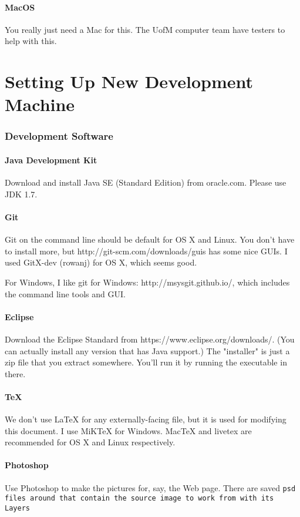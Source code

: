 \documentclass[12pt]{article}
\begin{document}
\subsection{MacOS}
You really just need a Mac for this.  The UofM computer team have testers to help with this.

\part{Setting Up New Development Machine}
\section{Development Software}
\subsection{Java Development Kit}
Download and install Java SE (Standard Edition) from oracle.com.  Please use JDK 1.7.

\subsection{Git}
Git on the command line should be default for OS X and Linux.  You don't have to install more, but http://git-scm.com/downloads/guis has some nice GUIs.  I used GitX-dev (rowanj) for OS X, which seems good.

For Windows, I like git for Windows:  http://msysgit.github.io/, which includes the command line tools and GUI.

\subsection{Eclipse}
Download the Eclipse Standard from https://www.eclipse.org/downloads/.  (You can actually install any version that has Java support.)  The "installer" is just a zip file that you extract somewhere.  You'll run it by running the executable in there.

\subsection{TeX}
We don't use LaTeX for any externally-facing file, but it is used for modifying this document.  I use MiKTeX for Windows.  MacTeX and livetex are recommended for OS X and Linux respectively.

\subsection{Photoshop}
Use Photoshop to make the pictures for, say, the Web page.  There are saved \verb .psd  files around that contain the source image to work from with its Layers.
\end{document}
